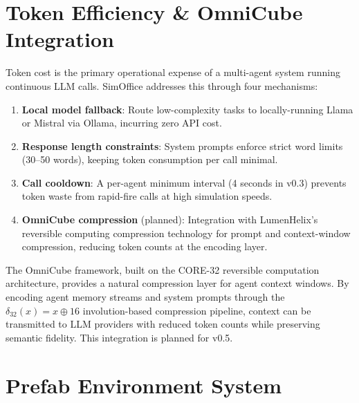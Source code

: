 \documentclass[11pt,letterpaper]{article}
\begin{document}
\section{Token Efficiency \& OmniCube Integration}

Token cost is the primary operational expense of a multi-agent system running continuous LLM calls. SimOffice addresses this through four mechanisms:

\begin{enumerate}[leftmargin=2em]
  \item \textbf{Local model fallback}: Route low-complexity tasks to locally-running Llama or Mistral via Ollama, incurring zero API cost.

  \item \textbf{Response length constraints}: System prompts enforce strict word limits (30--50 words), keeping token consumption per call minimal.

  \item \textbf{Call cooldown}: A per-agent minimum interval (4 seconds in v0.3) prevents token waste from rapid-fire calls at high simulation speeds.

  \item \textbf{OmniCube compression} (planned): Integration with LumenHelix's reversible computing compression technology for prompt and context-window compression, reducing token counts at the encoding layer.
\end{enumerate}

\begin{archbox}
The OmniCube framework, built on the CORE-32 reversible computation architecture, provides a natural compression layer for agent context windows. By encoding agent memory streams and system prompts through the $\delta_{32}(x) = x \oplus 16$ involution-based compression pipeline, context can be transmitted to LLM providers with reduced token counts while preserving semantic fidelity. This integration is planned for v0.5.
\end{archbox}


\section{Prefab Environment System}
\end{document}
